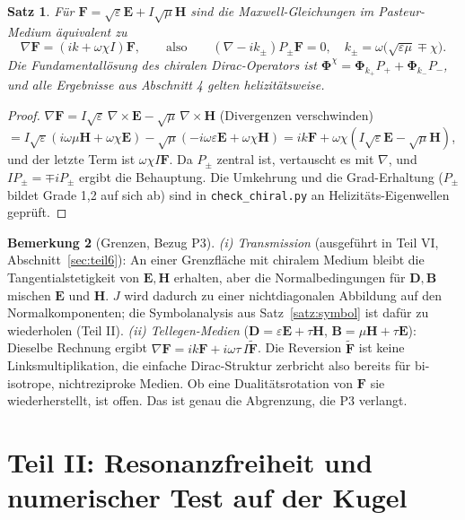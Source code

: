 \documentclass[11pt, a4paper]{article}
\newcommand{\mvec}[1]{\boldsymbol{#1}}
\theoremstyle{plain}
\newtheorem{satz}{Satz}[section]
\theoremstyle{definition}
\newtheorem{bemerkung}[satz]{Bemerkung}
\newcommand{\status}[1]{\hfill{\small\sffamily[#1]}}
\begin{document}
\begin{satz}\label{satz:chiral}\status{bewiesen, num.\ verif.}
Für $\mvec{F} = \sqrt\varepsilon\mvec{E} + I\sqrt\mu\mvec{H}$ sind die
Maxwell-Gleichungen im Pasteur-Medium äquivalent zu
\[
  \nabla\mvec{F} = (ik + \omega\chi I)\mvec{F},\qquad\text{also}\qquad
  (\nabla - ik_\pm)P_\pm\mvec{F} = 0,\quad k_\pm = \omega\big(\sqrt{\varepsilon\mu}\mp\chi\big).
\]
Die Fundamentallösung des chiralen Dirac-Operators ist
$\mvec{\Phi}^{\chi} = \mvec{\Phi}_{k_+}P_+ + \mvec{\Phi}_{k_-}P_-$, und alle
Ergebnisse aus Abschnitt 4 gelten helizitätsweise.
\end{satz}
\begin{proof}
$\nabla\mvec{F} = I\sqrt\varepsilon\,\nabla\times\mvec{E} - \sqrt\mu\,\nabla\times\mvec{H}$
(Divergenzen verschwinden) $= I\sqrt\varepsilon(i\omega\mu\mvec{H}+\omega\chi\mvec{E})
- \sqrt\mu(-i\omega\varepsilon\mvec{E}+\omega\chi\mvec{H}) = ik\mvec{F} +
\omega\chi(I\sqrt\varepsilon\mvec{E}-\sqrt\mu\mvec{H})$, und der letzte Term ist
$\omega\chi I\mvec{F}$. Da $P_\pm$ zentral ist, vertauscht es mit $\nabla$, und
$IP_\pm = \mp iP_\pm$ ergibt die Behauptung. Die Umkehrung und die Grad-Erhaltung
($P_\pm$ bildet Grade 1,2 auf sich ab) sind in \texttt{check\_chiral.py} an
Helizitäts-Eigenwellen geprüft.
\end{proof}

\begin{bemerkung}[Grenzen, Bezug P3]
\emph{(i) Transmission} (ausgeführt in Teil VI, Abschnitt~\ref{sec:teil6}): An einer Grenzfläche mit chiralem Medium bleibt die
Tangentialstetigkeit von $\mvec{E},\mvec{H}$ erhalten, aber die Normalbedingungen
für $\mvec{D},\mvec{B}$ mischen $\mvec{E}$ und $\mvec{H}$. $J$ wird dadurch zu einer
nichtdiagonalen Abbildung auf den Normalkomponenten; die Symbolanalysis aus
Satz~\ref{satz:symbol} ist dafür zu wiederholen (Teil II).
\emph{(ii) Tellegen-Medien} ($\mvec{D}=\varepsilon\mvec{E}+\tau\mvec{H}$,
$\mvec{B}=\mu\mvec{H}+\tau\mvec{E}$): Dieselbe Rechnung ergibt
$\nabla\mvec{F} = ik\mvec{F} + i\omega\tau\,I\tilde{\mvec{F}}$. Die Reversion
$\tilde{\mvec{F}}$ ist keine Linksmultiplikation, die einfache Dirac-Struktur
zerbricht also bereits für bi-isotrope, nichtreziproke Medien. Ob eine
Dualitätsrotation von $\mvec{F}$ sie wiederherstellt, ist offen. Das ist genau die
Abgrenzung, die P3 verlangt.
\end{bemerkung}

\section{Teil II: Resonanzfreiheit und numerischer Test auf der Kugel}\label{sec:teil2}
\end{document}
